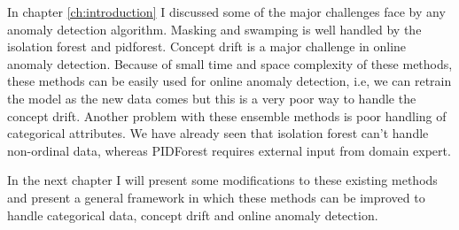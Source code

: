 In chapter \ref{ch:introduction} I discussed some of the major challenges face by any anomaly detection algorithm. 
Masking and swamping is well handled by the isolation forest and pidforest. 
Concept drift is a major challenge in online anomaly detection. 
Because of small time and space complexity of these methods, these methods can be easily used for online anomaly detection, i.e, we can retrain the model as the new data comes but this is a very poor way to handle the concept drift.
Another problem with these ensemble methods is poor handling of categorical attributes. We have already seen that isolation forest can't handle non-ordinal data, whereas PIDForest requires external input from domain expert.

In the next chapter I will present some modifications to these existing methods and present a general framework in which these methods can be improved to handle categorical data, concept drift and online anomaly detection.
